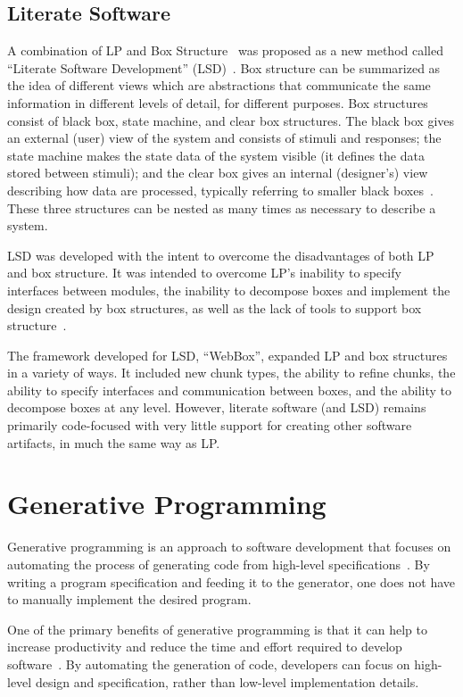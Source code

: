 \subsection{Literate Software}

A combination of LP and Box Structure~\cite{Mills1986} was proposed as a new
method called ``Literate Software Development''
(LSD)~\cite{AlMatiiAndBoujarwah2002}. Box structure can be summarized as the
idea of different views which are abstractions that communicate the same
information in different levels of detail, for different purposes. Box
structures consist of black box, state machine, and clear box structures. The
black box gives an external (user) view of the system and consists of stimuli
and responses; the state machine makes the state data of the system visible (it
defines the data stored between stimuli); and the clear box gives an internal
(designer's) view describing how data are processed, typically referring to
smaller black boxes~\cite{Mills1986}. These three structures can be nested as
many times as necessary to describe a system.

LSD was developed with the intent to overcome the disadvantages of both LP and
box structure. It was intended to overcome LP's inability to specify interfaces
between modules, the inability to decompose boxes and implement the design
created by box structures, as well as the lack of tools to support box
structure~\cite{Deck1996}.

The framework developed for LSD, ``WebBox'', expanded LP and box structures in a
variety of ways. It included new chunk types, the ability to refine chunks, the
ability to specify interfaces and communication between boxes, and the ability
to decompose boxes at any level. However, literate software (and LSD) remains
primarily code-focused with very little support for creating other software
artifacts, in much the same way as LP.

\section{Generative Programming}

Generative programming is an approach to software development that focuses on 
automating the process of generating code from high-level 
specifications~\cite{Czarnecki2000,Taha2006}. By writing a program 
specification and feeding it to the generator, one does not have to manually 
implement the desired program.

One of the primary benefits of generative programming is that it can help to 
increase productivity and reduce the time and effort required to develop 
software~\cite{Czarnecki2000}. By automating the generation of code, developers 
can focus on high-level design and specification, rather than low-level 
implementation details.

